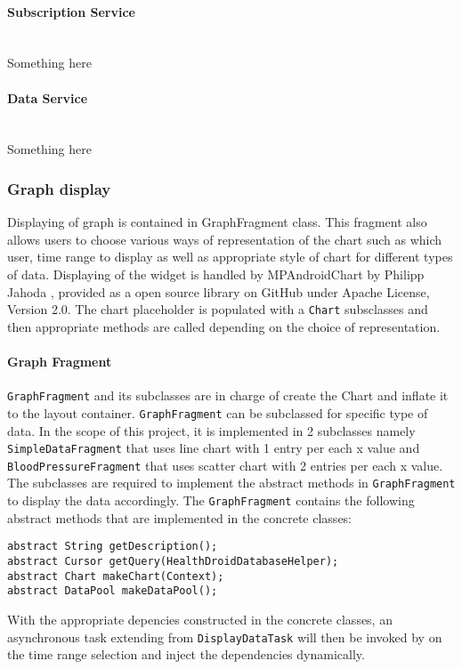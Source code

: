 \paragraph{Subscription Service} \mbox{} \\
Something here

\paragraph{Data Service} \mbox{} \\
Something here

\subsubsection{Graph display}
Displaying of graph is contained in GraphFragment class. This fragment also allows users to choose various ways of
representation of the chart such as which user, time range to display as well as appropriate style of chart for
different types of data. Displaying of the widget is handled by MPAndroidChart by Philipp Jahoda \cite{MPAndroidChart},
provided as a open source library on GitHub under Apache License, Version 2.0. The chart placeholder is populated with a
\texttt{Chart} subsclasses and then appropriate methods are called depending on the choice of representation.

\paragraph{Graph Fragment}
\texttt{GraphFragment} and its subclasses are in charge of create the Chart and inflate it to the layout container.
\texttt{GraphFragment} can be subclassed for specific type of data. In the scope of this project, it is implemented in 2
subclasses namely \texttt{SimpleDataFragment} that uses line chart with 1 entry per each x value and
\texttt{BloodPressureFragment} that uses scatter chart with 2 entries per each x value. The subclasses are required to
implement the abstract methods in \texttt{GraphFragment} to display the data accordingly.  The \texttt{GraphFragment}
contains the following abstract methods that are implemented in the concrete classes:
\begin{lstlisting}
abstract String getDescription();
abstract Cursor getQuery(HealthDroidDatabaseHelper);
abstract Chart makeChart(Context);
abstract DataPool makeDataPool();
\end{lstlisting}
With the appropriate depencies constructed in the concrete classes, an asynchronous task extending from
\texttt{DisplayDataTask} will then be invoked by on the time range selection and inject the dependencies dynamically.

